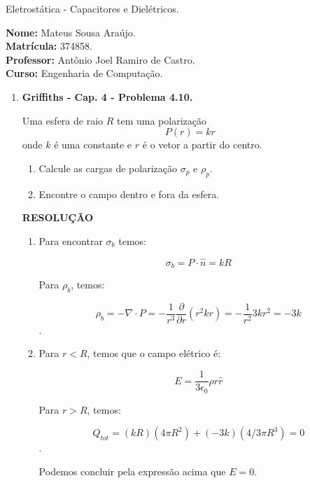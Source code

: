 \documentclass[11pt,a4paper]{article}
\begin{document}
	\begin{center}
		\Large Eletrostática - Capacitores e Dielétricos. 
	\end{center}

\begin{flushleft}
\textbf{Nome:} Mateus Sousa Araújo. \\
\textbf{Matrícula:} 374858. \\
\textbf{Professor:} Antônio Joel Ramiro de Castro. \\
\textbf{Curso:} Engenharia de Computação. \\
\end{flushleft}

\begin{enumerate}

\item \textbf{Griffiths - Cap. 4 - Problema 4.10.}

Uma esfera de raio $R$ tem uma polarização
$$P(r) = kr$$
onde $k$ é uma constante e $r$ é o vetor a partir do centro. 

\begin{enumerate}
\item Calcule as cargas de polarização $\sigma_p$ e $\rho_p$.
\item Encontre o campo dentro e fora da esfera.
\end{enumerate}


\textbf{RESOLUÇÃO}

\begin{enumerate}

\item 

Para encontrar $\sigma_b$ temos:

$$\sigma_b = P \cdot \hat{n} = kR$$

Para $\rho_b$, temos:

$$\rho_b = - \nabla \cdot P = -\displaystyle\dfrac{1}{r^3} \displaystyle\dfrac{\partial}{\partial r}(r^2kr) = -\displaystyle\dfrac{1}{r^2} 3kr^2 = -3k$$.


\item

Para $r < R$, temos que o campo elétrico é:

$$E = \displaystyle\dfrac{1}{3\epsilon_0} \rho r \hat{r}$$

Para $r > R$, temos:

$$Q_{tot} = (kR)(4\pi R^2) + (-3k)(4/3\pi R^3) = 0$$. 

Podemos concluir pela expressão acima que $E = 0$.


\end{enumerate}
\end{enumerate}
\end{document}

